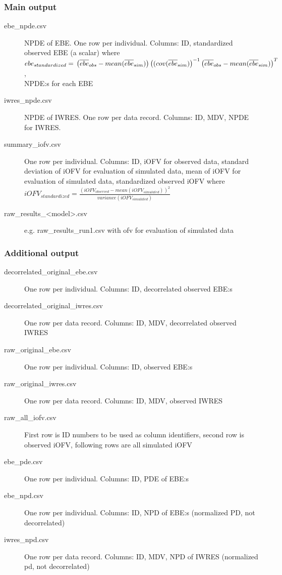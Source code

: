 \subsubsection*{Main output}
\begin{description}
\item[ebe\_npde.csv] NPDE of EBE. One row per individual. Columns: ID,
standardized observed EBE (a scalar) where 
$ebe_{standardized}= \\
\left(\overline{ebe}_{obs} - mean (\overline{ebe}_{sim})\right)\left((cov(\overline{ebe}_{sim})\right)^{-1}
\left(\overline{ebe}_{obs} - mean (\overline{ebe}_{sim})\right)^T$,\\ 
NPDE:s for each EBE
\item[iwres\_npde.csv] NPDE of IWRES. One row per data record. Columns: ID, MDV, NPDE for IWRES.
\item[summary\_iofv.csv] One row per individual. Columns: ID, iOFV for observed data, standard deviation 
of iOFV for evaluation of simulated data,
mean of iOFV for evaluation of simulated data, standardized observed iOFV where
$iOFV_{standardized}=\frac{(iOFV_{observed} - mean (iOFV_{simulated}))^2}{variance(iOFV_{simulated})}$
\item[raw\_results\_<model>.csv] e.g. raw\_results\_run1.csv with ofv for evaluation of simulated data
\end{description}

\subsubsection*{Additional output}
\begin{description}
\item[decorrelated\_original\_ebe.csv] One row per individual. Columns: ID, decorrelated observed EBE:s
\item[decorrelated\_original\_iwres.csv] One row per data record. Columns: ID, MDV, decorrelated observed IWRES
\item[raw\_original\_ebe.csv]  One row per individual. Columns: ID, observed EBE:s
\item[raw\_original\_iwres.csv] One row per data record. Columns: ID, MDV, observed IWRES
\item[raw\_all\_iofv.csv] First row is ID numbers to be used as column identifiers, second row is observed iOFV, following rows
are all simulated iOFV
\item[ebe\_pde.csv] One row per individual. Columns: ID, PDE of EBE:s
\item[ebe\_npd.csv] One row per individual. Columns: ID, NPD of EBE:s (normalized PD, not decorrelated)
\item[iwres\_npd.csv]  One row per data record. Columns: ID, MDV, NPD of IWRES (normalized pd, not decorrelated)
\end{description}

